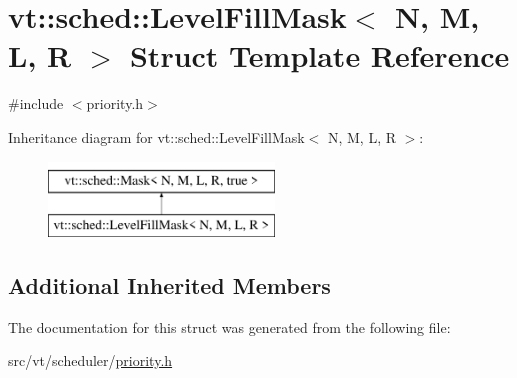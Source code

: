 \hypertarget{structvt_1_1sched_1_1_level_fill_mask}{}\section{vt\+:\+:sched\+:\+:Level\+Fill\+Mask$<$ N, M, L, R $>$ Struct Template Reference}
\label{structvt_1_1sched_1_1_level_fill_mask}


{\ttfamily \#include $<$priority.\+h$>$}

Inheritance diagram for vt\+:\+:sched\+:\+:Level\+Fill\+Mask$<$ N, M, L, R $>$\+:\begin{figure}[H]
\begin{center}
\leavevmode
\includegraphics[height=2.000000cm]{structvt_1_1sched_1_1_level_fill_mask}
\end{center}
\end{figure}
\subsection*{Additional Inherited Members}


The documentation for this struct was generated from the following file\+:\begin{DoxyCompactItemize}
\item 
src/vt/scheduler/\hyperlink{priority_8h}{priority.\+h}\end{DoxyCompactItemize}
